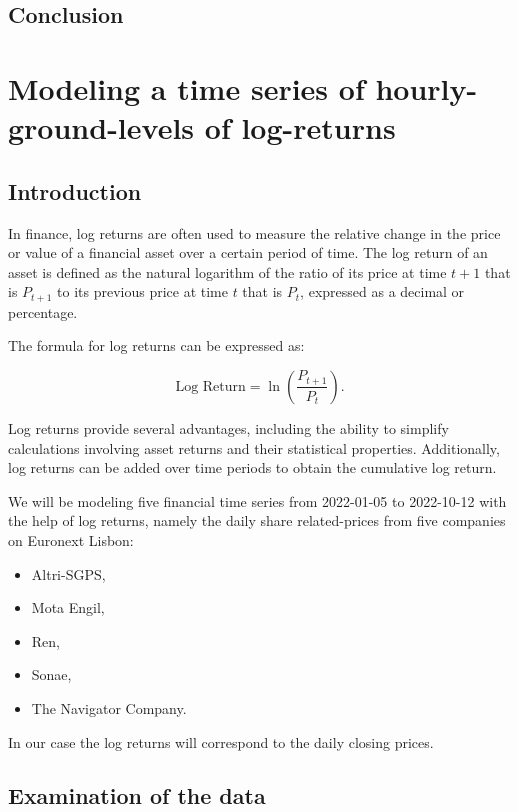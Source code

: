 \documentclass{article}
\begin{document}
\subsection{Conclusion}







\newpage

\section{Modeling a time series of hourly-ground-levels of log-returns}

\subsection{Introduction}

In finance, log returns are often used to measure the relative change in the price or value of a financial asset over a certain period of time. The log return of an asset is defined as the natural logarithm of the ratio of its price at time $t+1$ that is $P_{t+1}$  to its previous price at time $t$ that is $P_t$, expressed as a decimal or percentage.

The formula for log returns can be expressed as:

\begin{equation*}
\text{Log Return} = \ln \left(\frac{P_{t+1}}{P_t}\right).
\end{equation*}

Log returns provide several advantages, including the ability to simplify calculations involving asset returns and their statistical properties. Additionally, log returns can be added over time periods to obtain the cumulative log return.

We will be modeling five financial time series from 2022-01-05 to 2022-10-12 with the help of log returns, namely the daily share related-prices from five companies on Euronext Lisbon:  
\begin{itemize}
    \item Altri-SGPS,
    \item Mota Engil,
    \item Ren,
    \item Sonae,
    \item The Navigator Company.
\end{itemize} 
In our case the log returns will correspond to the daily closing prices.

\subsection{Examination of the data}
\label{sect:2.2}
\end{document}
